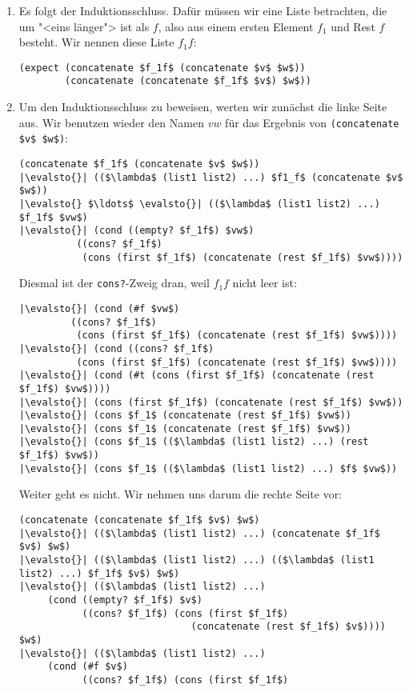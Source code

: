 \begin{enumerate}
\item Es folgt der Induktionsschluss.  Dafür müssen wir eine Liste
  betrachten, die um "<eins länger"> ist als $f$, also aus einem
  ersten Element $f_1$ und Rest $f$ besteht.  Wir nennen diese Liste
  $f_1f$:
\begin{lstlisting}
(expect (concatenate $f_1f$ (concatenate $v$ $w$))
        (concatenate (concatenate $f_1f$ $v$) $w$))
\end{lstlisting}
\item Um den Induktionsschluss zu beweisen, werten wir zunächst die
  linke Seite aus.  Wir benutzen wieder den Namen $vw$ für das
  Ergebnis von \lstinline{(concatenate $v$ $w$)}:
\begin{lstlisting}
(concatenate $f_1f$ (concatenate $v$ $w$))
|\evalsto{}| (($\lambda$ (list1 list2) ...) $f1_f$ (concatenate $v$ $w$))
|\evalsto{} $\ldots$ \evalsto{}| (($\lambda$ (list1 list2) ...) $f_1f$ $vw$)
|\evalsto{}| (cond ((empty? $f_1f$) $vw$)
          ((cons? $f_1f$) 
           (cons (first $f_1f$) (concatenate (rest $f_1f$) $vw$))))
\end{lstlisting}
  Diesmal ist der \lstinline{cons?}-Zweig dran, weil $f_1f$ nicht leer ist:
\begin{lstlisting}
|\evalsto{}| (cond (#f $vw$)
         ((cons? $f_1f$)
          (cons (first $f_1f$) (concatenate (rest $f_1f$) $vw$))))
|\evalsto{}| (cond ((cons? $f_1f$)
          (cons (first $f_1f$) (concatenate (rest $f_1f$) $vw$))))
|\evalsto{}| (cond (#t (cons (first $f_1f$) (concatenate (rest $f_1f$) $vw$))))
|\evalsto{}| (cons (first $f_1f$) (concatenate (rest $f_1f$) $vw$))
|\evalsto{}| (cons $f_1$ (concatenate (rest $f_1f$) $vw$))
|\evalsto{}| (cons $f_1$ (concatenate (rest $f_1f$) $vw$))
|\evalsto{}| (cons $f_1$ (($\lambda$ (list1 list2) ...) (rest $f_1f$) $vw$))
|\evalsto{}| (cons $f_1$ (($\lambda$ (list1 list2) ...) $f$ $vw$))
\end{lstlisting}
  Weiter geht es nicht.  Wir nehmen uns darum die rechte Seite vor:
\begin{lstlisting}
(concatenate (concatenate $f_1f$ $v$) $w$)
|\evalsto{}| (($\lambda$ (list1 list2) ...) (concatenate $f_1f$ $v$) $w$)
|\evalsto{}| (($\lambda$ (list1 list2) ...) (($\lambda$ (list1 list2) ...) $f_1f$ $v$) $w$)
|\evalsto{}| (($\lambda$ (list1 list2) ...)
     (cond ((empty? $f_1f$) $v$) 
           ((cons? $f_1f$) (cons (first $f_1f$)
                              (concatenate (rest $f_1f$) $v$)))) $w$)
|\evalsto{}| (($\lambda$ (list1 list2) ...)
     (cond (#f $v$) 
           ((cons? $f_1f$) (cons (first $f_1f$)

\end{lstlisting}
\end{enumerate}
